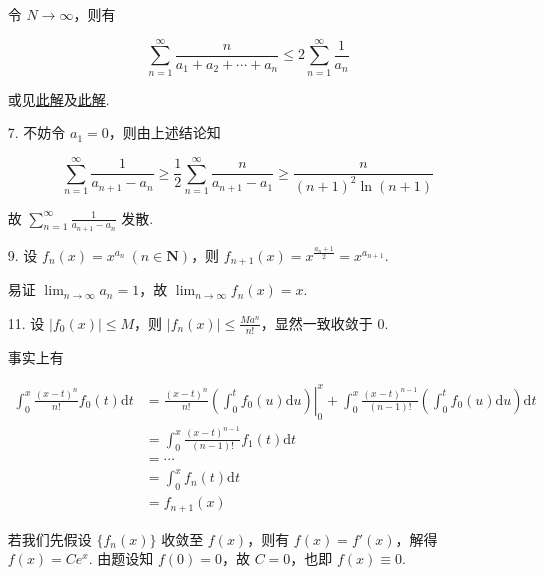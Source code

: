 \documentclass[oneside]{ctexbook} %
\begin{document}
\begin{enumerate}
    令 $N \to \infty$，则有

    $$
    \sum_{n=1}^{\infty} \frac n {a_1 + a_2 + \cdots + a_n} \leqslant 2 \sum_{n=1}^{\infty} \frac 1 {a_n}
    $$
    
    或见\href{https://math.stackexchange.com/posts/108598/revisions}{此解}及\href{https://www.komal.hu/feladat?a=feladat&f=A709&l=en}{此解}.
    \item[7.]
    不妨令 $a_1 = 0$，则由上述结论知

    $$
    \sum_{n=1}^{\infty} \frac 1 {a_{n+1} - a_n} \geqslant \frac 1 2 \sum_{n=1}^{\infty} \frac n {a_{n+1} - a_1} \geqslant \frac n {(n+1)^2 \ln(n+1)}
    $$

    故 $\displaystyle \sum_{n=1}^{\infty} \frac 1 {a_{n+1} - a_n}$ 发散.
    \item[9.]
    设 $f_n(x) = x^{a_n} \ (n \in \mathbf N)$，则 $f_{n+1}(x) = x^{\frac {a_n + 1} 2} = x^{a_{n+1}}$.

    易证 $\displaystyle \lim_{n \to \infty} a_n = 1$，故 $\displaystyle \lim_{n \to \infty} f_n(x) = x$.
    \item[11.]
    设 $|f_0(x)| \leqslant M$，则 $|f_n(x)| \leqslant \frac{Ma^n}{n!}$，显然一致收敛于 $0$.
    
    事实上有

    $$
    \begin{aligned}
        \int_0^x \frac{(x-t)^n}{n!} f_0(t) \mathrm dt &= \left. \frac{(x-t)^n}{n!} \left( \int_0^t f_0(u) \mathrm du \right) \right|_0^x + \int_0^x \frac{(x-t)^{n-1}}{(n-1)!} \left( \int_0^t f_0(u) \mathrm du \right) \mathrm dt \\
        &= \int_0^x \frac{(x-t)^{n-1}}{(n-1)!} f_1(t) \mathrm dt \\
        &= \cdots \\
        &= \int_0^x f_n(t) \mathrm dt \\
        &= f_{n+1}(x)
    \end{aligned}
    $$

    若我们先假设 $\{ f_n(x) \}$ 收敛至 $f(x)$，则有 $f(x) = f'(x)$，解得 $f(x) = Ce^x$. 由题设知 $f(0) = 0$，故 $C = 0$，也即 $f(x) \equiv 0$.
\end{enumerate}
\end{document}
